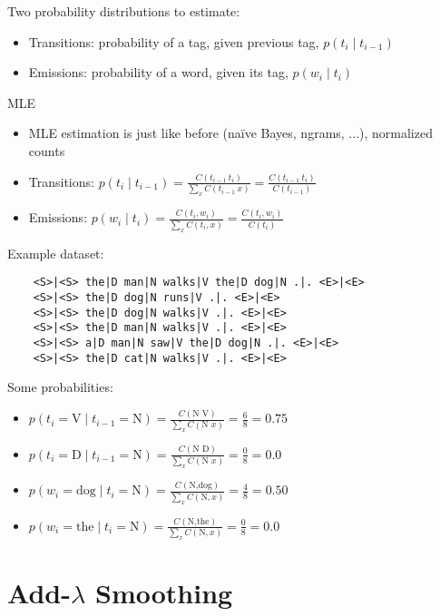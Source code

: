 \documentclass[11pt,letterpaper]{article}
\begin{document}
Two probability distributions to estimate:

\begin{itemize}
  \item Transitions: probability of a tag, given previous tag, $p(t_i \mid t_{i-1})$
  \item Emissions: probability of a word, given its tag, $p(w_i \mid t_i)$
\end{itemize}

MLE

\begin{itemize}
  \item MLE estimation is just like before (na\"{i}ve Bayes, ngrams, ...), normalized counts
  \item Transitions: $p(t_i \mid t_{i-1}) = \frac{C(t_{i-1}~t_i)}{\sum_x C(t_{i-1}~x)} = \frac{C(t_{i-1}~t_i)}{C(t_{i-1})}$
  \item Emissions: $p(w_i \mid t_i) = \frac{C(t_i,w_i)}{\sum_x C(t_i,x)} = \frac{C(t_i,w_i)}{C(t_i)}$
\end{itemize}

Example dataset:
\vspace{-2mm}
\begin{verbatim}
    <S>|<S> the|D man|N walks|V the|D dog|N .|. <E>|<E> 
    <S>|<S> the|D dog|N runs|V .|. <E>|<E> 
    <S>|<S> the|D dog|N walks|V .|. <E>|<E> 
    <S>|<S> the|D man|N walks|V .|. <E>|<E> 
    <S>|<S> a|D man|N saw|V the|D dog|N .|. <E>|<E> 
    <S>|<S> the|D cat|N walks|V .|. <E>|<E> 
\end{verbatim}

Some probabilities:

\begin{itemize}
  \item $p(t_i=\text{V} \mid t_{i-1}=\text{N}) = \frac{C(\text{N V})}{\sum_x C(\text{N } x)} = \frac{6}{8} = 0.75$
  \item $p(t_i=\text{D} \mid t_{i-1}=\text{N}) = \frac{C(\text{N D})}{\sum_x C(\text{N } x)} = \frac{0}{8} = 0.0$
  \\
  \item $p(w_i=\text{dog} \mid t_i=\text{N}) = \frac{C(\text{N,dog})}{\sum_x C(\text{N},x)} = \frac{4}{8} = 0.50$
  \item $p(w_i=\text{the} \mid t_i=\text{N}) = \frac{C(\text{N,the})}{\sum_x C(\text{N},x)} = \frac{0}{8} = 0.0$
\end{itemize}


\section{Add-$\lambda$ Smoothing}
\end{document}
